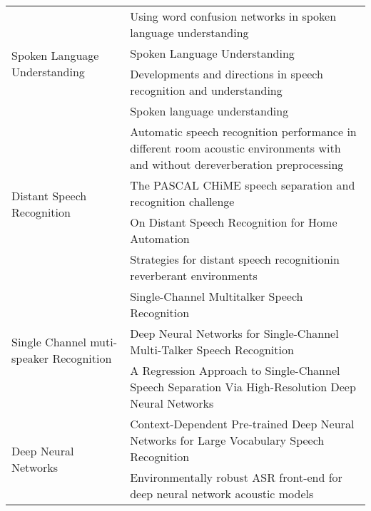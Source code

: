 \begin{landscape}
\begin{table}
\begin{tabular}{|l|l|}
\multirow{4}{*}{Spoken Language Understanding}  
& \multicolumn{1}{l}{Using word confusion networks in spoken language understanding\cite{Hakkani-Tur2006BeyondUnderstanding}} \\\cline{2-2}
& \multicolumn{1}{l}{Spoken Language Understanding \cite{DeMori2008SpokenUnderstanding}}  \\\cline{2-2}
& \multicolumn{1}{l}{Developments and directions in speech recognition and understanding \cite{Baker2009DevelopmentsEducation,Baker2009UpdatedEducation}} \\\cline{2-2}
& \multicolumn{1}{l}{Spoken language understanding\cite{Ye-YiWang2005SpokenUnderstanding}} \\\hline
\multirow{4}{*}{Distant Speech Recognition}  
& \multicolumn{1}{l}{Automatic speech recognition performance in different room acoustic environments with and without dereverberation preprocessing \cite{Tsilfidis2013AutomaticPreprocessing}} \\\cline{2-2}
& \multicolumn{1}{l}{The PASCAL CHiME speech separation and recognition challenge \cite{Ma2013TheChallenge}}  \\\cline{2-2}
& \multicolumn{1}{l}{On Distant Speech Recognition for Home Automation \cite{Vacher2015OnAutomation}} \\\cline{2-2}
& \multicolumn{1}{l}{Strategies for distant speech recognitionin reverberant environments \cite{Delcroix2015StrategiesEnvironments}} \\\hline
\multirow{3}{*}{Single Channel muti-speaker Recognition}  
& \multicolumn{1}{l}{Single-Channel Multitalker Speech Recognition \cite{Rennie2010Single-ChannelRecognition}} \\\cline{2-2}
& \multicolumn{1}{l}{Deep Neural Networks for Single-Channel Multi-Talker Speech Recognition \cite{Weng2015DeepRecognition}}  \\\cline{2-2}
& \multicolumn{1}{l}{A Regression Approach to Single-Channel Speech Separation Via High-Resolution Deep Neural Networks\cite{Du2016ANetworks}} \\\hline
\multirow{4}{*}{Deep Neural Networks}  
& \multicolumn{1}{l}{Context-Dependent Pre-trained Deep Neural Networks for Large Vocabulary Speech Recognition \cite{Deng2012}} \\\cline{2-2}
& \multicolumn{1}{l}{Environmentally robust ASR front-end for deep neural network acoustic models\cite{Yoshioka2015EnvironmentallyModels}}  \\\cline{2-2}

\end{tabular}
\end{table}
\end{landscape}

